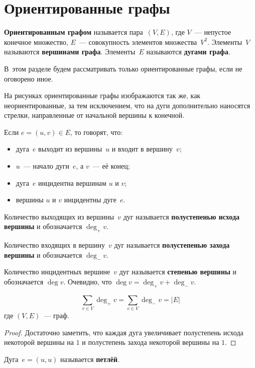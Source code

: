 \section{Ориентированные графы}
 \textbf{Ориентированным графом} называется пара~$(V, E)$, где $V$~--- непустое конечное множество, $E$~--- совокупность элементов множества~$V^2$.
Элементы~$V$ называются \textbf{вершинами графа}.
Элементы~$E$ называются \textbf{дугами графа}.

В~этом разделе будем рассматривать только ориентированные графы, если не оговорено иное.

На рисунках ориентированные графы изображаются так же, как неориентированные, за тем исключением, что на дуги дополнительно наносятся стрелки, направленные от начальной вершины к конечной.

Если $e = (u, v) \in E$, то говорят, что:
\begin{itemize}
	\item дуга~$e$ выходит из вершины~$u$ и входит в вершину~$v$;
	\item $u$~--- начало дуги~$e$, а $v$~--- её конец;
	\item дуга~$e$ инцидентна вершинам $u$ и $v$;
	\item вершины $u$ и $v$ инцидентны дуге~$e$.
\end{itemize}

 Количество выходящих из вершины~$v$ дуг называется \textbf{полустепенью исхода вершины} и обозначается $\deg_+ v$.

Количество входящих в вершину~$v$ дуг называется \textbf{полустепенью захода вершины} и обозначается $\deg_- v$.

Количество инцидентных вершине~$v$ дуг называется \textbf{степенью вершины} и обозначается $\deg v$.
Очевидно, что $\deg v = \deg_+ v + \deg_- v$.

\begin{statement}
\begin{equation*}
\sum_{v \in V} \deg_+ v = \sum_{v \in V} \deg_- v = |E|
\end{equation*}
где $(V, E)$~--- граф.
\end{statement}
\begin{proof}
Достаточно заметить, что каждая дуга увеличивает полустепень исхода некоторой вершины на $1$ и полустепень захода некоторой вершины на $1$.
\end{proof}

 Дуга~$e = (u, u)$ называется \textbf{петлёй}.


